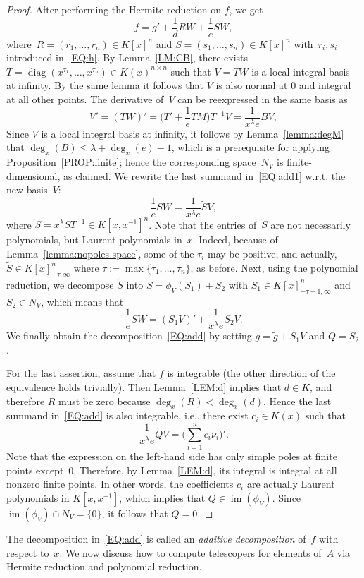 \documentclass[final,1p,times,authoryear]{elsarticle}
\def\im{\operatorname{im}}
\def\diag{\operatorname{diag}}
\begin{document}
\begin{proof}
After performing the Hermite reduction on $f$, we get
\begin{equation}\label{EQ:add1}
  f = \tilde{g}' + \frac{1}{d} RW + \frac{1}{e} SW,
\end{equation}
where~$R = (r_1, \ldots, r_n)\in K[x]^n$ and $S = (s_1, \ldots, s_n)\in K[x]^n$
with~$r_i, s_i$ introduced in~\eqref{EQ:h}. By Lemma~\ref{LM:CB}, there exists
$T = \diag(x^{\tau_1}, \ldots, x^{\tau_n}) \in K(x)^{n\times n}$ such that $V = TW$
is a local integral basis at infinity. By the same lemma it follows
that $V$ is also normal at $0$ and integral at all other points.
The derivative of~$V$ can be reexpressed in the same basis as
\[
  V' = (TW)' = \biggl(T' + \frac{1}{e}TM\biggr)T^{-1}V = \frac{1}{x^\lambda e}BV,
\]
Since $V$ is a local integral basis at infinity, it follows by
Lemma~\ref{lemma:degM} that $\deg_x(B) \leq \lambda + \deg_x(e)-1$, which is a
prerequisite for applying Proposition~\ref{PROP:finite}; hence the
corresponding space~$N_V$ is finite-dimensional, as claimed.
We rewrite the last summand in~\eqref{EQ:add1} w.r.t. the new basis~$V$:
\[
  \frac{1}{e} SW = \frac{1}{x^\lambda e} \tilde{S}V,
\]
where $\tilde{S} = x^\lambda S T^{-1} \in K[x,x^{-1}]^n$. Note that the entries
of~$\tilde{S}$ are not necessarily polynomials, but Laurent polynomials in~$x$.
Indeed, because of Lemma~\ref{lemma:nopoles-space}, some of the $\tau_i$
may be positive, and actually, $\tilde{S}\in K[x]_{-\tau,\infty}^n$ where
$\tau:=\max\{\tau_1,\dots,\tau_n\}$, as before. Next, using the polynomial reduction, we decompose
$\tilde{S}$ into $\tilde{S} = \phi_{V}(S_1) + S_2$ with
$S_1\in K[x]_{-\tau+1,\infty}^n$ and $S_2\in N_V$, which means that
\[
  \frac{1}{e} SW = (S_1 V)' + \frac{1}{x^\lambda e} S_2 V.
\]
We finally obtain the decomposition~\eqref{EQ:add} by setting
$g = \tilde{g} + S_1 V$ and $Q = S_2$.

For the last assertion, assume that $f$ is integrable (the other direction of
the equivalence holds trivially). Then Lemma~\ref{LEM:d} implies that $d\in K$,
and therefore $R$ must be zero because $\deg_x(R) < \deg_x(d)$. Hence the last
summand in~\eqref{EQ:add} is also integrable, i.e., there exist $c_i\in K(x)$
such that
\[
  \frac{1}{x^\lambda e} QV = \Biggl(\sum_{i=1}^n c_i \nu_i\Biggr)'.
\]
Note that the expression on the left-hand side has only simple poles at finite
points except~$0$. Therefore, by Lemma~\ref{LEM:d}, its integral is integral
at all nonzero finite points. In other words, the coefficients $c_i$ are actually
Laurent polynomials in $K[x,x^{-1}]$, which implies that $Q \in \im(\phi_V)$.
Since $\im(\phi_V) \cap N_V = \{0\}$, it follows that $Q=0$.
\end{proof}
The decomposition in~\eqref{EQ:add} is called an \emph{additive decomposition} of~$f$ with respect to~$x$.
We now discuss how to compute telescopers for elements of~$A$ via Hermite reduction and
polynomial reduction.
\end{document}
